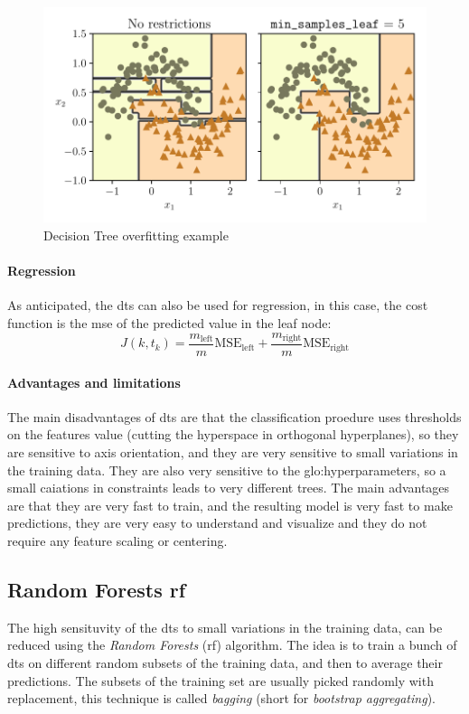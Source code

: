 \begin{figure}
    \centering
    \includegraphics{images/MachineLearning/DecisionTreeOverfitting.pdf}
    \caption{Decision Tree overfitting example }
    \label{fig:DecisionTreeOverfitting}
\end{figure}

\paragraph{Regression}
As anticipated, the \gls{dt}s can also be used for regression, in this case, the cost function is the \gls{mse} of the predicted value in the leaf node:
\begin{equation}
    J(k, t_k) = \frac{m_{\text{left}}}{m}\text{MSE}_{\text{left}} + \frac{m_{\text{right}}}{m}\text{MSE}_{\text{right}}
\end{equation}

\paragraph{Advantages and limitations}
The main disadvantages of \gls{dt}s are that the classification proedure uses thresholds on the features value (cutting the hyperspace in orthogonal hyperplanes), so they are sensitive to axis orientation, and they are very sensitive to small variations in the training data. They are also very sensitive to the \gls{glo:hyperparameter}s, so a small caiations in constraints leads to very different trees. The main advantages are that they are very fast to train, and the resulting model is very fast to make predictions, they are very easy to understand and visualize and they do not require any feature scaling or centering.

\subsection{Random Forests \gls{rf}}
\label{subsec:rf}
The high sensituvity of the \gls{dt}s to small variations in the training data, can be reduced using the \emph{Random Forests} (\gls{rf}) algorithm. The idea is to train a bunch of \gls{dt}s on different random subsets of the training data, and then to average their predictions. The subsets of the training set are usually picked randomly with replacement, this technique is called \emph{bagging} (short for \emph{bootstrap aggregating}). 

